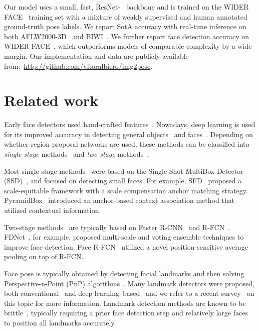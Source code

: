 \documentclass[final]{cvpr}
\newcommand{\minisection}[1]{\vspace{1mm}\noindent{\textbf{#1}.}}
\begin{document}
Our model uses a small, fast, ResNet-~\cite{resnet} backbone and is trained on the WIDER FACE~\cite{wider_face} training set with a mixture of weakly supervised and human annotated ground-truth pose labels.  We report SotA accuracy with real-time inference on both AFLW2000-3D~\cite{3ddfa} and BIWI~\cite{biwi}. We further report face detection accuracy on WIDER FACE~\cite{wider_face}, which outperforms models of comparable complexity by a wide margin. Our implementation and data are publicly available from:~\url{http://github.com/vitoralbiero/img2pose}.


\section{Related work}
 Early face detectors used hand-crafted features~\cite{HOG, edgeori, haar}. Nowadays, deep learning is used for its improved accuracy in detecting general objects~\cite{faster_rcnn} and faces~\cite{retinaface, asfd}. Depending on whether region proposal networks are used, these methods can be classified into {\em single-stage} methods~\cite{ssd, redmon2016yolo9000, yolov3} and {\em two-stage} methods~\cite{faster_rcnn}.


Most single-stage methods~\cite{dsfd, ssh, pyramidbox, s3fd} were based on the Single Shot MultiBox Detector (SSD)~\cite{ssd}, and focused on detecting small faces. For example, SFD~\cite{s3fd} proposed a scale-equitable framework with a scale compensation anchor matching strategy. PyramidBox~\cite{pyramidbox} introduced an anchor-based context association method that utilized contextual information. 


Two-stage methods~\cite{facerfcn, fdnet} are typically based on Faster R-CNN~\cite{faster_rcnn} and R-FCN~\cite{rfcn}. FDNet~\cite{fdnet}, for example, proposed multi-scale and voting ensemble techniques to improve face detection. Face R-FCN~\cite{facerfcn} utilized a novel position-sensitive average pooling on top of R-FCN. 




\minisection{Face alignment and pose estimation}
Face pose is typically obtained by detecting facial landmarks and then solving Perspective-n-Point (PnP) algorithms~\cite{posit, epnp}. Many landmark detectors were proposed, both conventional~\cite{burgos2013robust, cao2014face, cootes1998active, liu2007generic} and deep learning--based~\cite{bulat2017far, sun2013deep, wu2017facial, zhu2012face} and we refer to a recent survey~\cite{landmark_survey} on this topic for more information. Landmark detection methods are known to be brittle~\cite{chang2019deep, faceposenet}, typically requiring a prior face detection step and relatively large faces to position all landmarks accurately.  
\end{document}
